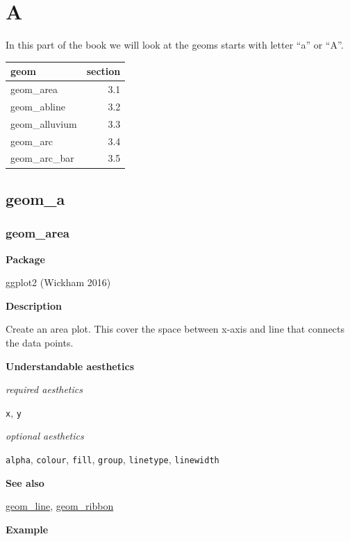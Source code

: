 \documentclass[
  letterpaper,
  DIV=11,
  numbers=noendperiod]{scrreprt}
\begin{document}
\part{A}

In this part of the book we will look at the geoms starts with letter
``a'' or ``A''.

\begin{longtable}[]{@{}lr@{}}
\toprule\noalign{}
geom & section \\
\midrule\noalign{}
\endhead
\bottomrule\noalign{}
\endlastfoot
geom\_area & 3.1 \\
geom\_abline & 3.2 \\
geom\_alluvium & 3.3 \\
geom\_arc & 3.4 \\
geom\_arc\_bar & 3.5 \\
\end{longtable}

\chapter{geom\_a}\label{sec-a}

\section{geom\_area}\label{area}

\textbf{Package}

ggplot2 (Wickham 2016)

\textbf{Description}

Create an area plot. This cover the space between x-axis and line that
connects the data points.

\textbf{Understandable aesthetics}

\emph{required aesthetics}

\texttt{x}, \texttt{y}

\emph{optional aesthetics}

\texttt{alpha}, \texttt{colour}, \texttt{fill}, \texttt{group},
\texttt{linetype}, \texttt{linewidth}

\textbf{See also}

\hyperref[line]{geom\_line}, \hyperref[ribbon]{geom\_ribbon}

\textbf{Example}
\end{document}
